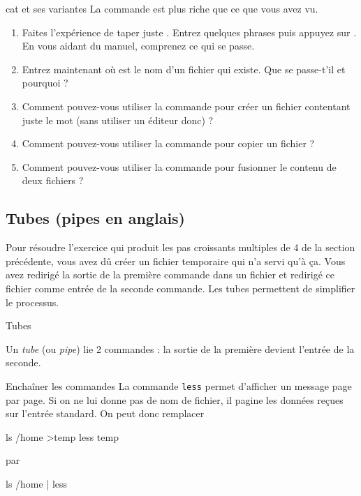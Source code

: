 \documentclass[a4paper,11pt]{style-esi/td}
\begin{document}
		\begin{Exercice}{cat et ses variantes}
			La commande  est plus riche que ce que vous avez vu.
			\begin{enumerate}
			\item 
				Faites l'expérience de taper juste .
				Entrez quelques phrases puis appuyez sur .
				En vous aidant du manuel, comprenez ce qui se passe.
			\item 
				Entrez maintenant  
				où  est le nom d'un fichier qui existe.
				Que se passe-t'il et pourquoi ?
			\item 
				Comment pouvez-vous utiliser la commande 
				pour créer un fichier contentant juste le mot 
				(sans utiliser un éditeur donc) ?
			\item 
				Comment pouvez-vous utiliser la commande 
				pour copier un fichier ?
			\item 
				Comment pouvez-vous utiliser la commande 
				pour fusionner le contenu de deux fichiers ?
			\end{enumerate}
		\end{Exercice}

    \subsection{Tubes (pipes en anglais)}

		Pour résoudre l'exercice 
		qui produit les pas croissants multiples de 4 de la section précédente, 
		vous avez dû créer un fichier temporaire qui n'a servi qu'à \c ca. 
		Vous avez redirigé la sortie de la première commande dans un fichier 
		et redirigé ce fichier comme entrée de la seconde commande.
		Les tubes permettent de simplifier le processus.
						
		\begin{theorie}{Tubes}

			\medskip
			Un \emph{tube} (ou \emph{pipe}) lie 2 commandes :
			la sortie de la première devient l'entrée de la seconde.
		\end{theorie}
			
		\begin{Exemple}{Enchaîner les commandes} 
			La commande \verb_less_ permet d'afficher un message page par page.
			Si on ne lui donne pas de nom de fichier, il pagine les données reçues sur l'entrée standard. 
			On peut donc remplacer
					
			\begin{Console}
				ls /home >temp
				less temp
			\end{Console}
			par					
			\begin{Console}
				ls /home | less
			\end{Console}	
		\end{Exemple}
			
\end{document}
